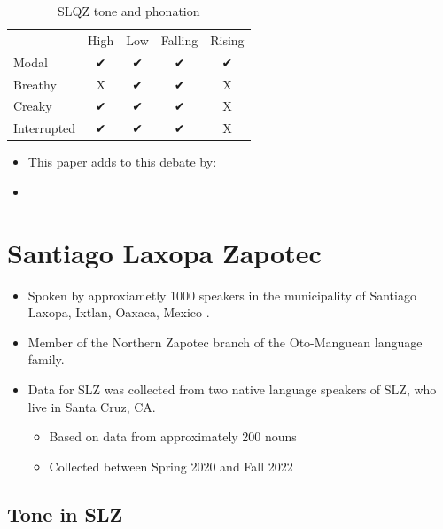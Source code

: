 \documentclass[12pt, letterpaper]{article}
\providecommand{\lsptoprule}{\midrule\toprule}
\providecommand{\lspbottomrule}{\bottomrule\midrule}
\begin{document}
\begin{table}[!ht]
	\centering
	\caption{SLQZ tone and phonation}
	\label{tab:SLQZ}
	 \begin{tabular}{lcccc}
	  \lsptoprule
					  &	 High  & Low & Falling & Rising \\
		  Modal	& ✔︎ & ✔︎ & ✔︎ & ✔︎ \\
		  Breathy & X & ✔︎ & ✔︎ & X \\
		  Creaky & ✔︎ & ✔︎ & ✔︎ & X \\
		  Interrupted & ✔︎ & ✔︎ & ✔︎ & X \\
	  \lspbottomrule
	 \end{tabular}
	\end{table}
\begin{itemize}
	\item This paper adds to this debate by: 
	\item \citet{silvermanLaryngealComplexityOtomanguean1997}
\end{itemize}



\section{Santiago Laxopa Zapotec} \label{sec:SLZ}

\begin{itemize}
	\item Spoken by approxiametly 1000 speakers in the municipality of Santiago Laxopa, Ixtlan, Oaxaca, Mexico \citep{adlerAcousticsPhonationTypes2016,adlerDerivationVerbInitiality2018,foleyForbiddenCliticClusters2018,foleyExtendingPersonCaseConstraint2020}. 
	\item Member of the Northern Zapotec branch of the Oto-Manguean language family.
	\item Data for SLZ was collected from two native language speakers of SLZ, who live in Santa Cruz, CA. 
	\begin{itemize}
		\item Based on data from approximately 200 nouns
		\item Collected between Spring 2020 and Fall 2022
	\end{itemize}
\end{itemize}

\subsection{Tone in SLZ} \label{sec:Tone}
\end{document}
